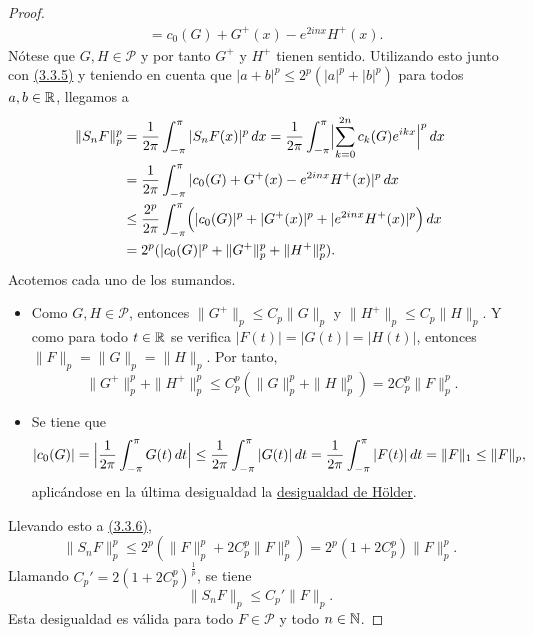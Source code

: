 \documentclass[a4paper, 12pt]{book}
\begin{document}
\begin{proof}
\begin{align*}
        &= c_0(G) + G^+(x) - e^{2inx}H^+(x).
    \end{align*}
    Nótese que $G,H\in\mathcal{P}$ y por tanto $G^+$ y $H^+$ tienen sentido. Utilizando esto junto con \hyperref[3.3.5]{(3.3.5)} y teniendo en cuenta que $|a+b|^p \leq 2^p(|a|^p+|b|^p)$ para todos $a,b\in\R$, llegamos a
    \begin{equation}\label{3.3.6}
    \begin{aligned}[b]
        \|S_nF\|_p^p &= \frac{1}{2\pi}\integral[x]{-\pi}{\pi}{|S_nF(x)|^p} = \frac{1}{2\pi}\integral[x]{-\pi}{\pi}{\Bigl|\sum_{k=0}^{2n}c_k(G)e^{ikx}\Bigr|^p} \\ 
        &=\frac{1}{2\pi}\integral[x]{-\pi}{\pi}{|c_0(G)+G^+(x)-e^{2inx}H^+(x)|^p} \\
        &\leq \frac{2^p}{2\pi}\integral[x]{-\pi}{\pi}{\Bigl(|c_0(G)|^p+|G^+(x)|^p+|e^{2inx}H^+(x)|^p\Bigr)} \\
        &= 2^p(|c_0(G)|^p + \|G^+\|_p^p + \|H^+\|_p^p).
    \end{aligned}
    \end{equation}
    Acotemos cada uno de los sumandos.
    \begin{itemize}
        \item Como $G,H \in \mathcal{P}$, entonces $\|G^+\|_p \leq C_p \|G\|_p$ y $\|H^+\|_p \leq C_p\|H\|_p$. Y como para todo $t \in \R$ se verifica $|F(t)| = |G(t)| = |H(t)|$, entonces $\|F\|_p=\|G\|_p=\|H\|_p$. Por tanto,
        \[\|G^+\|_p^p + \|H^+\|_p^p \leq C_p^p(\|G\|_p^p+\|H\|_p^p) = 2C_p^p\|F\|_p^p.\]
        \item Se tiene que
        \[|c_0(G)| = \Bigl|\frac{1}{2\pi}\integral{-\pi}{\pi}{G(t)}\Bigr| \leq \frac{1}{2\pi}\integral{-\pi}{\pi}{|G(t)|} = \frac{1}{2\pi}\integral{-\pi}{\pi}{|F(t)|} = \|F\|_1 \leq \|F\|_p,\]
        aplicándose en la última desigualdad la \hyperref[1.1.1]{desigualdad de Hölder}.
    \end{itemize}
    Llevando esto a \hyperref[3.3.6]{(3.3.6)},
    \[\|S_nF\|_p^p \leq 2^p(\|F\|_p^p + 2C_p^p\|F\|_p^p) = 2^p(1+2C_p^p)\|F\|_p^p.\]
    Llamando $C_p' = 2(1+2C_p^p)^{\frac{1}{p}}$, se tiene
    \[\|S_nF\|_p \leq C_p'\|F\|_p.\]
    Esta desigualdad es válida para todo $F \in \mathcal{P}$ y todo $n \in \N$.


\end{proof}
\end{document}
